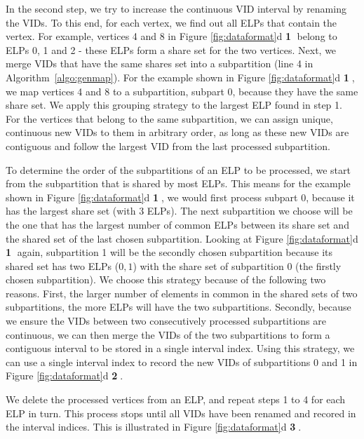  In the second step, we try to increase the continuous VID interval by renaming the VIDs. To this end, for
each vertex, we find out all ELPs that contain the vertex. For example, vertices 4 and 8 in Figure \ref{fig:dataformat}d \textbf{\textcircled{1}} belong to ELPs 0,
1 and 2 - these ELPs form a share set for the two vertices. Next, we merge VIDs that have the same shares set into a subpartition (line 4
in Algorithm~\ref{algo:genmap}). For the example shown in Figure \ref{fig:dataformat}d \textbf{\textcircled{1}}, we map vertices 4 and 8 to a subpartition, subpart 0, because they have the same share set. We apply this grouping strategy to the largest ELP found in step 1. For the vertices that belong
to the same subpartition, we can assign unique, continuous new VIDs to them in arbitrary order, as long as these new VIDs are contiguous
and follow the largest VID from the last processed subpartition.

 To determine the order of the subpartitions of an ELP to be processed, we start from the
subpartition that is shared by most ELPs.  This means for the example shown in Figure \ref{fig:dataformat}d \textbf{\textcircled{1}}, we would first process
subpart 0, because it has the largest share set (with 3 ELPs).  The next subpartition we choose will be the one that has the largest number of common ELPs between its share set and the shared set of the last chosen subpartition. Looking at Figure \ref{fig:dataformat}d \textbf{\textcircled{1}} again, subpartition 1 will be the secondly chosen subpartition because its shared set has two ELPs ($0, 1$) with the share set of subpartition 0 (the firstly chosen subpartition). We choose this strategy because of the following two reasons.
First, the larger number of elements in common in the shared sets of two subpartitions, the more ELPs will have the two subpartitions.
Secondly, because we ensure the VIDs between two consecutively processed subpartitions are continuous, we can then merge the VIDs of the
two subpartitions to form a contiguous interval to be stored in a single interval index. Using this strategy, we can use a single interval index to record the new VIDs of subpartitions 0 and 1 in Figure \ref{fig:dataformat}d \textbf{\textcircled{2}}.


 We delete the processed vertices from an ELP, and repeat steps 1 to 4 for each ELP in turn. This
process stops until all VIDs have been renamed and recored in the interval indices. This is illustrated in Figure \ref{fig:dataformat}d \textbf{\textcircled{3}}.


